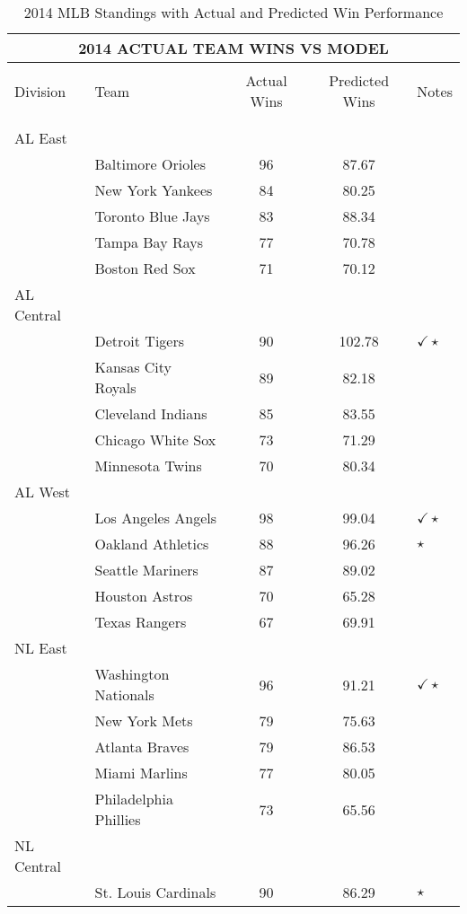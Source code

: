 \documentclass{article} %
\begin{document}
\begin{table}[h!]
\caption{2014 MLB Standings with Actual and Predicted Win Performance }
\label{table1}
\begin{center}
\begin{tabular}{llccl}
\multicolumn{5}{c}{\bf 2014 ACTUAL TEAM WINS VS MODEL}
\\ \hline \\
Division & Team & Actual Wins & Predicted Wins & Notes \\
\\ \hline \\
AL East &  &  &  &  \\
& Baltimore Orioles & 96 & 87.67 &$ $ \\
& New York Yankees & 84 & 80.25 & \\
& Toronto Blue Jays & 83 & 88.34 & \\
& Tampa Bay Rays & 77 & 70.78 & \\
& Boston Red Sox & 71 & 70.12 & \\
AL Central & & & & \\
& Detroit Tigers & 90 & 102.78 & $\checkmark 	\star $ \\
& Kansas City Royals & 89 & 82.18 & \\
& Cleveland Indians & 85 & 83.55 & \\
& Chicago White Sox & 73 & 71.29 & \\
& Minnesota Twins & 70 & 80.34 & \\
AL West & & & & \\
& Los Angeles Angels & 98 & 99.04 & $\checkmark 	\star $ \\
& Oakland Athletics & 88 & 96.26 & $\star$ \\
& Seattle Mariners & 87 & 89.02 &  \\
& Houston Astros & 70 & 65.28 & \\
& Texas Rangers & 67 & 69.91 & \\
NL East & & & & \\
& Washington Nationals & 96 & 91.21 & $\checkmark 	\star $ \\
& New York Mets & 79 & 75.63 & \\
& Atlanta Braves & 79 & 86.53 & \\
& Miami Marlins & 77 & 80.05 & \\
& Philadelphia Phillies & 73 & 65.56 & \\
NL Central & & & & \\
& St. Louis Cardinals & 90 & 86.29 & $\star $\\

\end{tabular}
\end{center}
\end{table}
\end{document}
